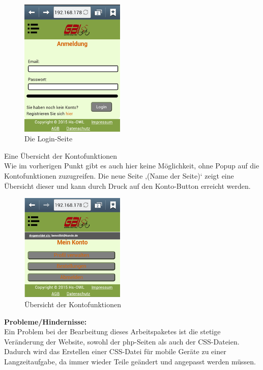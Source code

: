 \begin{figure}[H]
\begin{center}
\includegraphics[width=5cm]{Bilder/Michael_Abbildung8-DieLogin-Seite.png}
\end{center}
\caption{Die Login-Seite}
\end{figure}

Eine Übersicht der Kontofunktionen
\\
Wie im vorherigen Punkt gibt es auch hier keine Möglichkeit, ohne Popup auf die Kontofunktionen zuzugreifen. Die neue Seite ‚(Name der Seite)‘ zeigt eine Übersicht dieser und kann durch Druck auf den Konto-Button erreicht werden.

\begin{figure}[H]
\begin{center}
\includegraphics[width=5cm]{Bilder/Michael_Abbildung9-UebersichtDerKontofunktionen.png}
\end{center}
\caption{Übersicht der Kontofunktionen}
\end{figure}

\newpage
\textbf{Probleme/Hindernisse:}
\\
Ein Problem bei der Bearbeitung dieses Arbeitspaketes ist die stetige Veränderung der Website, sowohl der php-Seiten als auch der CSS-Dateien. Dadurch wird das Erstellen einer CSS-Datei für mobile Geräte zu einer Langzeitaufgabe, da immer wieder Teile geändert und angepasst werden müssen. 


